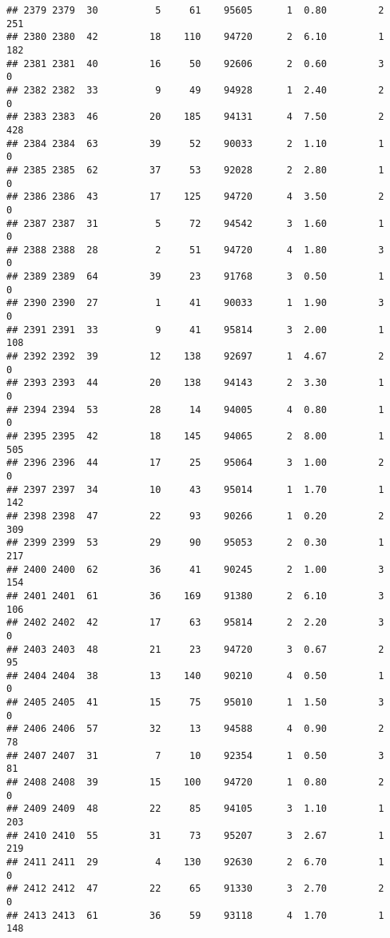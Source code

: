 \documentclass[
]{article}
\begin{document}
\begin{verbatim}
## 2379 2379  30          5     61    95605      1  0.80         2      251
## 2380 2380  42         18    110    94720      2  6.10         1      182
## 2381 2381  40         16     50    92606      2  0.60         3        0
## 2382 2382  33          9     49    94928      1  2.40         2        0
## 2383 2383  46         20    185    94131      4  7.50         2      428
## 2384 2384  63         39     52    90033      2  1.10         1        0
## 2385 2385  62         37     53    92028      2  2.80         1        0
## 2386 2386  43         17    125    94720      4  3.50         2        0
## 2387 2387  31          5     72    94542      3  1.60         1        0
## 2388 2388  28          2     51    94720      4  1.80         3        0
## 2389 2389  64         39     23    91768      3  0.50         1        0
## 2390 2390  27          1     41    90033      1  1.90         3        0
## 2391 2391  33          9     41    95814      3  2.00         1      108
## 2392 2392  39         12    138    92697      1  4.67         2        0
## 2393 2393  44         20    138    94143      2  3.30         1        0
## 2394 2394  53         28     14    94005      4  0.80         1        0
## 2395 2395  42         18    145    94065      2  8.00         1      505
## 2396 2396  44         17     25    95064      3  1.00         2        0
## 2397 2397  34         10     43    95014      1  1.70         1      142
## 2398 2398  47         22     93    90266      1  0.20         2      309
## 2399 2399  53         29     90    95053      2  0.30         1      217
## 2400 2400  62         36     41    90245      2  1.00         3      154
## 2401 2401  61         36    169    91380      2  6.10         3      106
## 2402 2402  42         17     63    95814      2  2.20         3        0
## 2403 2403  48         21     23    94720      3  0.67         2       95
## 2404 2404  38         13    140    90210      4  0.50         1        0
## 2405 2405  41         15     75    95010      1  1.50         3        0
## 2406 2406  57         32     13    94588      4  0.90         2       78
## 2407 2407  31          7     10    92354      1  0.50         3       81
## 2408 2408  39         15    100    94720      1  0.80         2        0
## 2409 2409  48         22     85    94105      3  1.10         1      203
## 2410 2410  55         31     73    95207      3  2.67         1      219
## 2411 2411  29          4    130    92630      2  6.70         1        0
## 2412 2412  47         22     65    91330      3  2.70         2        0
## 2413 2413  61         36     59    93118      4  1.70         1      148

\end{verbatim}
\end{document}

